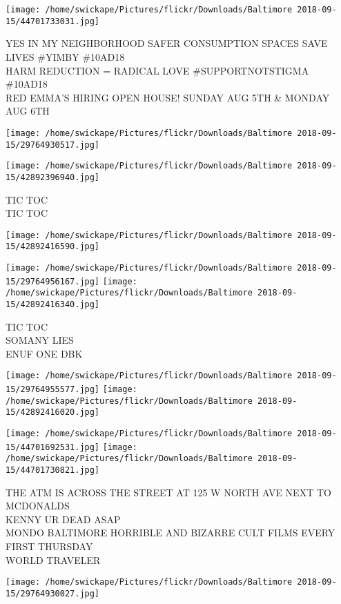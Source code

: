 \documentclass[10pt,letterpaper]{article}
\begin{document}
\texttt{[image: /home/swickape/Pictures/flickr/Downloads/Baltimore 2018-09-15/44701733031.jpg]}

YES IN MY NEIGHBORHOOD SAFER CONSUMPTION SPACES SAVE LIVES \#YIMBY \#10AD18\\
HARM REDUCTION = RADICAL LOVE \#SUPPORTNOTSTIGMA \#10AD18\\
RED EMMA'S HIRING OPEN HOUSE!   SUNDAY AUG 5TH \& MONDAY AUG 6TH
\pagebreak

\texttt{[image: /home/swickape/Pictures/flickr/Downloads/Baltimore 2018-09-15/29764930517.jpg]}

\vspace{0.25in}
\texttt{[image: /home/swickape/Pictures/flickr/Downloads/Baltimore 2018-09-15/42892396940.jpg]}

TIC TOC\\
TIC TOC
\pagebreak

\texttt{[image: /home/swickape/Pictures/flickr/Downloads/Baltimore 2018-09-15/42892416590.jpg]}

\vspace{0.25in}
\texttt{[image: /home/swickape/Pictures/flickr/Downloads/Baltimore 2018-09-15/29764956167.jpg]}
\texttt{[image: /home/swickape/Pictures/flickr/Downloads/Baltimore 2018-09-15/42892416340.jpg]}

TIC TOC\\
SOMANY LIES\\
ENUF ONE DBK
\pagebreak

\texttt{[image: /home/swickape/Pictures/flickr/Downloads/Baltimore 2018-09-15/29764955577.jpg]}
\texttt{[image: /home/swickape/Pictures/flickr/Downloads/Baltimore 2018-09-15/42892416020.jpg]}

\texttt{[image: /home/swickape/Pictures/flickr/Downloads/Baltimore 2018-09-15/44701692531.jpg]}
\texttt{[image: /home/swickape/Pictures/flickr/Downloads/Baltimore 2018-09-15/44701730821.jpg]}

THE ATM IS ACROSS THE STREET AT 125 W NORTH AVE NEXT TO MCDONALDS\\
KENNY UR DEAD ASAP\\
MONDO BALTIMORE HORRIBLE AND BIZARRE CULT FILMS EVERY FIRST THURSDAY\\
WORLD TRAVELER
\pagebreak

\texttt{[image: /home/swickape/Pictures/flickr/Downloads/Baltimore 2018-09-15/29764930027.jpg]}
\end{document}
